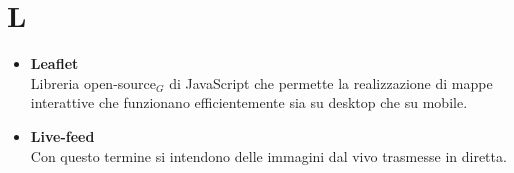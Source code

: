 \chapter{L} \label{L}
\begin{itemize}
	\item \textbf{Leaflet} \\
	Libreria open-source$_G$ di JavaScript che permette la realizzazione di mappe interattive che funzionano efficientemente sia su desktop che su mobile. 
	
	\item \textbf{Live-feed}\\
	Con questo termine si intendono delle immagini dal vivo trasmesse in diretta.
	
\end{itemize}